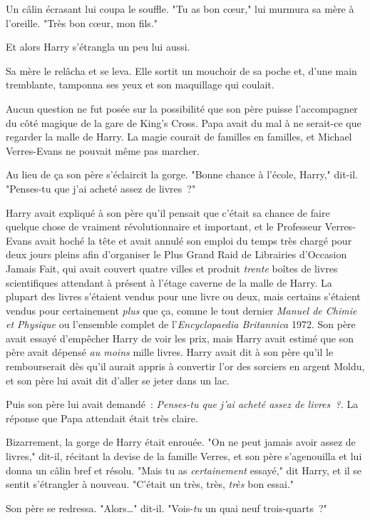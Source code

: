 Un câlin écrasant lui coupa le souffle. "Tu as bon cœur," lui murmura sa mère à l'oreille. "Très bon cœur, mon fils."

Et alors Harry s'étrangla un peu lui aussi.

Sa mère le relâcha et se leva. Elle sortit un mouchoir de sa poche et, d'une main tremblante, tamponna ses yeux et son maquillage qui coulait.

Aucun question ne fut posée sur la possibilité que son père puisse l'accompagner du côté magique de la gare de King's Cross. Papa avait du mal à ne serait-ce que regarder la malle de Harry. La magie courait de familles en familles, et Michael Verres-Evans ne pouvait même pas marcher.

Au lieu de ça son père s'éclaircit la gorge. "Bonne chance à l'école, Harry," dit-il. "Penses-tu que j'ai acheté assez de livres~?"

Harry avait expliqué à son père qu'il pensait que c'était sa chance de faire quelque chose de vraiment révolutionnaire et important, et le Professeur Verres-Evans avait hoché la tête et avait annulé son emploi du temps très chargé pour deux jours pleins afin d'organiser le Plus Grand Raid de Librairies d'Occasion Jamais Fait, qui avait couvert quatre villes et produit \emph{trente} boîtes de livres scientifiques attendant à présent à l'étage caverne de la malle de Harry. La plupart des livres s'étaient vendus pour une livre ou deux, mais certains s'étaient vendus pour certainement \emph{plus} que ça, comme le tout dernier \emph{Manuel de Chimie et Physique} ou l'ensemble complet de l'\emph{Encyclopaedia Britannica} 1972. Son père avait essayé d'empêcher Harry de voir les prix, mais Harry avait estimé que son père avait dépensé \emph{au moins} mille livres. Harry avait dit à son père qu'il le rembourserait dès qu'il aurait appris à convertir l'or des sorciers en argent Moldu, et son père lui avait dit d'aller se jeter dans un lac.

Puis son père lui avait demandé~: \emph{Penses-tu que j'ai acheté assez de livres~?.} La réponse que Papa attendait était très claire.

Bizarrement, la gorge de Harry était enrouée. "On ne peut jamais avoir assez de livres," dit-il, récitant la devise de la famille Verres, et son père s'agenouilla et lui donna un câlin bref et résolu. "Mais tu as \emph{certainement} essayé," dit Harry, et il se sentit s'étrangler à nouveau. "C'était un très, très, \emph{très} bon essai."

Son père se redressa. "Alors…" dit-il. "Vois-\emph{tu} un quai neuf trois-quarts~?"

